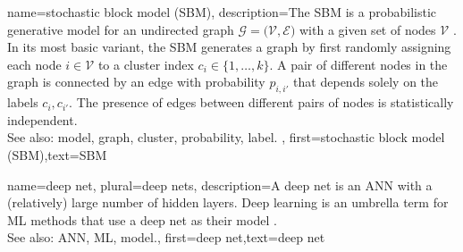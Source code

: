 {name={stochastic block model (SBM)},
	description={The SBM is a 
		probabilistic generative model for an undirected graph $\mathcal{G} = \big( \mathcal{V}, \mathcal{E} \big)$ 
		with a given set of nodes $\mathcal{V}$ \cite{AbbeSBM2018}. In its most basic variant, 
		the SBM generates a graph by first randomly assigning each node $i \in \mathcal{V}$ to 
		a cluster index $c_{i} \in \{1,\ldots,k\}$. A pair of different nodes in the 
		graph is connected by an edge with probability $p_{i,i'}$ that depends 
		solely on the labels $c_{i}, c_{i'}$. 
		The presence of edges between different pairs of 
		nodes is statistically independent.
					\\ 
		See also: model, graph, cluster, probability, label. },
	first={stochastic block model (SBM)},text={SBM} 
}

{name={deep net}, plural={deep nets},
	description={A deep net is an ANN with a (relatively) large number of 
	hidden layers. Deep learning is an umbrella term for ML methods that use a deep 
	net as their model \cite{Goodfellow-et-al-2016}.
				\\ 
		See also: ANN, ML, model.},
	first={deep net},text={deep net} 
}

\newcommand{\gaussiancenter}{3}

